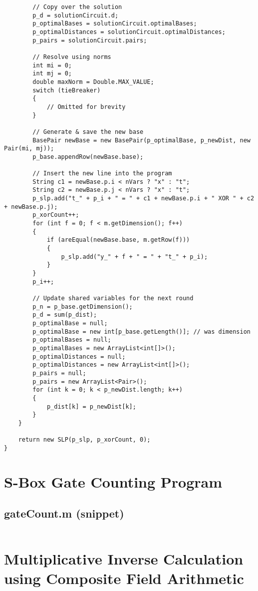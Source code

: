 \begin{verbatim}
        // Copy over the solution
        p_d = solutionCircuit.d;    
        p_optimalBases = solutionCircuit.optimalBases;
        p_optimalDistances = solutionCircuit.optimalDistances;
        p_pairs = solutionCircuit.pairs;

        // Resolve using norms
        int mi = 0;
        int mj = 0;
        double maxNorm = Double.MAX_VALUE;
        switch (tieBreaker)
        {
            // Omitted for brevity
        }

        // Generate & save the new base
        BasePair newBase = new BasePair(p_optimalBase, p_newDist, new Pair(mi, mj));
        p_base.appendRow(newBase.base);

        // Insert the new line into the program
        String c1 = newBase.p.i < nVars ? "x" : "t";
        String c2 = newBase.p.j < nVars ? "x" : "t";
        p_slp.add("t_" + p_i + " = " + c1 + newBase.p.i + " XOR " + c2 + newBase.p.j);
        p_xorCount++;
        for (int f = 0; f < m.getDimension(); f++)
        {
            if (areEqual(newBase.base, m.getRow(f)))
            {
                p_slp.add("y_" + f + " = " + "t_" + p_i);
            }
        }
        p_i++;

        // Update shared variables for the next round
        p_n = p_base.getDimension(); 
        p_d = sum(p_dist);
        p_optimalBase = null;
        p_optimalBase = new int[p_base.getLength()]; // was dimension
        p_optimalBases = null;
        p_optimalBases = new ArrayList<int[]>();
        p_optimalDistances = null;
        p_optimalDistances = new ArrayList<int[]>();
        p_pairs = null;
        p_pairs = new ArrayList<Pair>();
        for (int k = 0; k < p_newDist.length; k++)
        {
            p_dist[k] = p_newDist[k];
        }
    }

    return new SLP(p_slp, p_xorCount, 0); 
}
\end{verbatim}

\section{S-Box Gate Counting Program}
\subsection{gateCount.m (snippet)}
\inputminted[fontsize=\tiny,frame=single]{java}{../../src/CompositeFields/magma/gateCount_snippet.m}

\section{Multiplicative Inverse Calculation using Composite Field Arithmetic}
